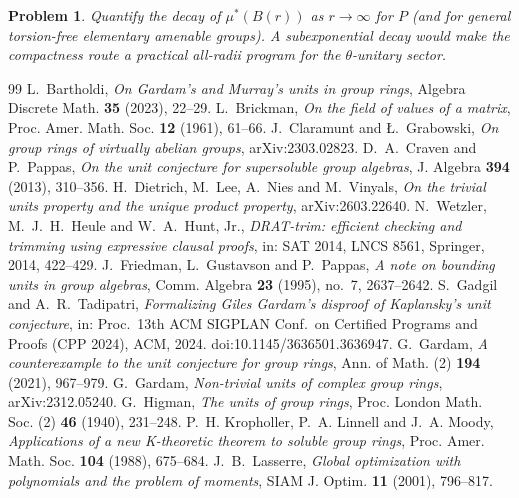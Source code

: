 \documentclass[10pt,a4paper]{amsart}
\newtheorem{problem}[theorem]{Problem}
\begin{document}
\begin{problem}\label{prob:decay}
Quantify the decay of $\mu^*(B(r))$ as $r\to\infty$ for $P$ (and for
general torsion-free elementary amenable groups).  A subexponential
decay would make the compactness route a practical all-radii
program for the $\theta$-unitary sector.
\end{problem}


\begin{thebibliography}{99}
 L.~Bartholdi, \emph{On Gardam's and Murray's units in group rings}, Algebra Discrete Math. \textbf{35} (2023), 22--29.
 L.~Brickman, \emph{On the field of values of a matrix}, Proc. Amer. Math. Soc. \textbf{12} (1961), 61--66.
 J.~Claramunt and {\L}.~Grabowski, \emph{On group rings of virtually abelian groups}, arXiv:2303.02823.
 D.~A.~Craven and P.~Pappas, \emph{On the unit conjecture for supersoluble group algebras}, J. Algebra \textbf{394} (2013), 310--356.
 H.~Dietrich, M.~Lee, A.~Nies and M.~Vinyals, \emph{On the trivial units property and the unique product property}, arXiv:2603.22640.
 N.~Wetzler, M.~J.~H.~Heule and W.~A.~Hunt, Jr., \emph{DRAT-trim: efficient checking and trimming using expressive clausal proofs}, in: SAT 2014, LNCS 8561, Springer, 2014, 422--429.
 J.~Friedman, L.~Gustavson and P.~Pappas, \emph{A note on bounding units in group algebras}, Comm. Algebra \textbf{23} (1995), no.~7, 2637--2642.
 S.~Gadgil and A.~R.~Tadipatri, \emph{Formalizing Giles Gardam's disproof of Kaplansky's unit conjecture}, in: Proc.\ 13th ACM SIGPLAN Conf.\ on Certified Programs and Proofs (CPP 2024), ACM, 2024. doi:10.1145/3636501.3636947.
 G.~Gardam, \emph{A counterexample to the unit conjecture for group rings}, Ann. of Math. (2) \textbf{194} (2021), 967--979.
 G.~Gardam, \emph{Non-trivial units of complex group rings}, arXiv:2312.05240.
 G.~Higman, \emph{The units of group rings}, Proc. London Math. Soc. (2) \textbf{46} (1940), 231--248.
 P.~H. Kropholler, P.~A. Linnell and J.~A. Moody, \emph{Applications of a new K-theoretic theorem to soluble group rings}, Proc. Amer. Math. Soc. \textbf{104} (1988), 675--684.
 J.~B.~Lasserre, \emph{Global optimization with polynomials and the problem of moments}, SIAM J. Optim. \textbf{11} (2001), 796--817.

\end{thebibliography}
\end{document}
